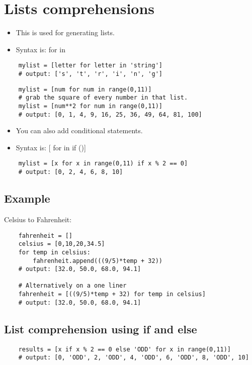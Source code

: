 \section{Lists comprehensions}
\begin{itemize}
    \item This is used for generating lists.
    \item Syntax is:  for  in   
\end{itemize}
\begin{verbatim}
    mylist = [letter for letter in 'string']
    # output: ['s', 't', 'r', 'i', 'n', 'g']
\end{verbatim}
\begin{verbatim}
    mylist = [num for num in range(0,11)]
    # grab the square of every number in that list.
    mylist = [num**2 for num in range(0,11)]
    # output: [0, 1, 4, 9, 16, 25, 36, 49, 64, 81, 100]
\end{verbatim}
\begin{itemize}
    \item You can also add conditional statements.
    \item Syntax is: [ for  in  if ()]
\end{itemize}
\begin{verbatim}
    mylist = [x for x in range(0,11) if x % 2 == 0]
    # output: [0, 2, 4, 6, 8, 10]
\end{verbatim}

\subsection{Example}
Celsius to Fahrenheit: 
\begin{verbatim}
    fahrenheit = []
    celsius = [0,10,20,34.5]
    for temp in celsius: 
        fahrenheit.append(((9/5)*temp + 32))
    # output: [32.0, 50.0, 68.0, 94.1]

    # Alternatively on a one liner
    fahrenheit = [((9/5)*temp + 32) for temp in celsius]
    # output: [32.0, 50.0, 68.0, 94.1]
\end{verbatim}

\subsection{List comprehension using if and else}
\begin{verbatim}
    results = [x if x % 2 == 0 else 'ODD' for x in range(0,11)]
    # output: [0, 'ODD', 2, 'ODD', 4, 'ODD', 6, 'ODD', 8, 'ODD', 10]
\end{verbatim}

